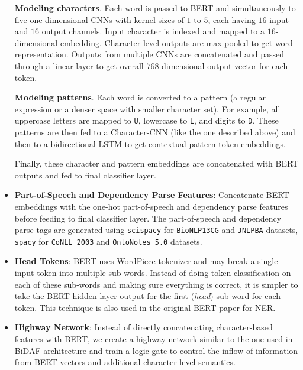 \begin{itemize}
    \textbf{Modeling characters}. Each word is passed to BERT and simultaneously to five one-dimensional CNNs with kernel sizes of $1$ to $5$, each having $16$ input and $16$ output channels. Input character is indexed and mapped to a $16$-dimensional embedding. Character-level outputs are max-pooled to get word representation. Outputs from multiple CNNs are concatenated and passed through a linear layer to get overall $768$-dimensional output vector for each token.
    
    \textbf{Modeling patterns}. Each word is converted to a pattern (a regular expression or a denser space with smaller character set). For example, all uppercase letters are mapped to \texttt{U}, lowercase to \texttt{L}, and digits to \texttt{D}. These patterns are then fed to a Character-CNN (like the one described above) and then to a bidirectional LSTM to get contextual pattern token embeddings.
    
    Finally, these character and pattern embeddings are concatenated with BERT outputs and fed to final classifier layer.
    
    \item \textbf{Part-of-Speech and Dependency Parse Features}: Concatenate BERT embeddings with the one-hot part-of-speech and dependency parse features before feeding to final classifier layer. The part-of-speech and dependency parse tags are generated using \texttt{scispacy} for \texttt{BioNLP13CG} and \texttt{JNLPBA} datasets, \texttt{spacy} for \texttt{CoNLL 2003} and \texttt{OntoNotes 5.0} datasets.
    
    \item \textbf{Head Tokens}: BERT uses WordPiece tokenizer and may break a single input token into multiple sub-words. Instead of doing token classification on each of these sub-words and making sure everything is correct, it is simpler to take the BERT hidden layer output for the first (\textit{head}) sub-word for each token. This technique is also used in the original BERT paper\cite{devlin2018bert} for NER.
    
    \item \textbf{Highway Network}: Instead of directly concatenating character-based features with BERT, we create a highway network\cite{srivastava2015highway} similar to the one used in BiDAF\cite{seo2016bidirectional} architecture and train a logic gate to control the inflow of information from BERT vectors and additional character-level semantics.
\end{itemize}

